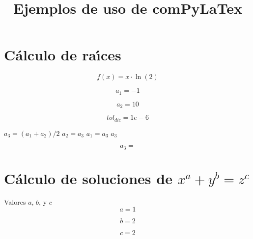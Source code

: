 \documentclass{article}
\title{Ejemplos de uso de comPyLaTex}
\author{}
\date{}
\begin{document}
\maketitle


\section{C\'alculo de ra\'{\i}ces}

\begin{equation}
f(x) = x \cdot \ln(2)
\label{eq:calc:f}
\end{equation}

\begin{equation}
a_1 = -1 
\label{eq:calc:a1}
\end{equation}

\begin{equation}
a_2 = 10
\label{eq:calc:a2}
\end{equation}

\begin{equation}
    tol_{dic} = 1e-6
    \label{eq:calc:toldic}
\end{equation}

\begin{algorithm}
\caption{M\'etodo de dicotom\'{\i}a}
\label{alg:calc:a3}
\begin{algorithmic}
        \STATE $a_3 = (a_1 + a_2)/2$
            \STATE $a_2 = a_3$
        \ELSE
            \STATE $a_1 = a_3$
        \ENDIF
    \ENDWHILE
    \RETURN $a_3$
\end{algorithmic}
\end{algorithm}


\begin{equation}
    a_3 = 
    \label{eq:res:a3}
\end{equation}


\section{C\'alculo de soluciones de $x^a + y^b = z^c$}

Valores $a$, $b$, y $c$
\begin{equation}
a = 1
\label{eq:calc:a}
\end{equation}

\begin{equation}
b = 2
\label{eq:calc:b}
\end{equation}

\begin{equation}
c = 2
\label{eq:calc:c}
\end{equation}
\end{document}
